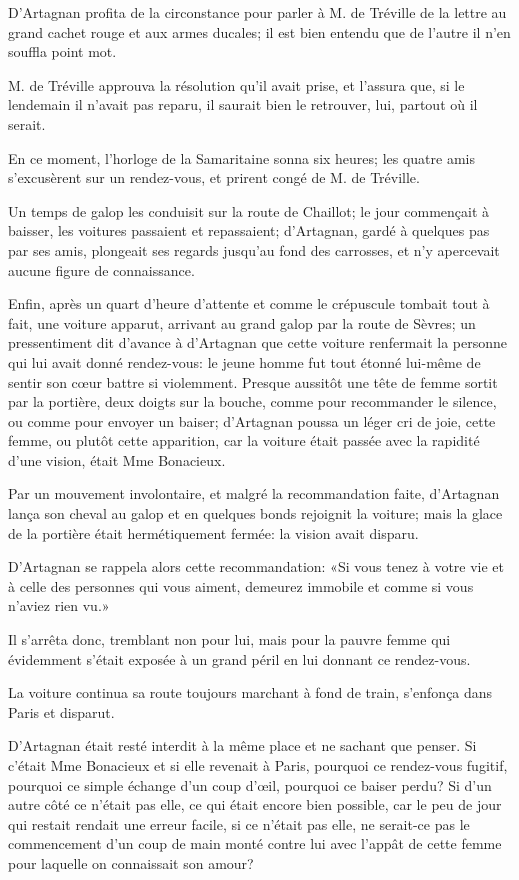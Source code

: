 D'Artagnan profita de la circonstance pour parler à M. de Tréville de la lettre au grand cachet rouge et aux armes ducales; il est bien entendu que de l'autre il n'en souffla point mot. 

M. de Tréville approuva la résolution qu'il avait prise, et l'assura que, si le lendemain il n'avait pas reparu, il saurait bien le retrouver, lui, partout où il serait. 

En ce moment, l'horloge de la Samaritaine sonna six heures; les quatre amis s'excusèrent sur un rendez-vous, et prirent congé de M. de Tréville. 

Un temps de galop les conduisit sur la route de Chaillot; le jour commençait à baisser, les voitures passaient et repassaient; d'Artagnan, gardé à quelques pas par ses amis, plongeait ses regards jusqu'au fond des carrosses, et n'y apercevait aucune figure de connaissance. 

Enfin, après un quart d'heure d'attente et comme le crépuscule tombait tout à fait, une voiture apparut, arrivant au grand galop par la route de Sèvres; un pressentiment dit d'avance à d'Artagnan que cette voiture renfermait la personne qui lui avait donné rendez-vous: le jeune homme fut tout étonné lui-même de sentir son cœur battre si violemment. Presque aussitôt une tête de femme sortit par la portière, deux doigts sur la bouche, comme pour recommander le silence, ou comme pour envoyer un baiser; d'Artagnan poussa un léger cri de joie, cette femme, ou plutôt cette apparition, car la voiture était passée avec la rapidité d'une vision, était Mme Bonacieux. 

Par un mouvement involontaire, et malgré la recommandation faite, d'Artagnan lança son cheval au galop et en quelques bonds rejoignit la voiture; mais la glace de la portière était hermétiquement fermée: la vision avait disparu. 

D'Artagnan se rappela alors cette recommandation: «Si vous tenez à votre vie et à celle des personnes qui vous aiment, demeurez immobile et comme si vous n'aviez rien vu.» 

Il s'arrêta donc, tremblant non pour lui, mais pour la pauvre femme qui évidemment s'était exposée à un grand péril en lui donnant ce rendez-vous. 

La voiture continua sa route toujours marchant à fond de train, s'enfonça dans Paris et disparut. 

D'Artagnan était resté interdit à la même place et ne sachant que penser. Si c'était Mme Bonacieux et si elle revenait à Paris, pourquoi ce rendez-vous fugitif, pourquoi ce simple échange d'un coup d'œil, pourquoi ce baiser perdu? Si d'un autre côté ce n'était pas elle, ce qui était encore bien possible, car le peu de jour qui restait rendait une erreur facile, si ce n'était pas elle, ne serait-ce pas le commencement d'un coup de main monté contre lui avec l'appât de cette femme pour laquelle on connaissait son amour? 

